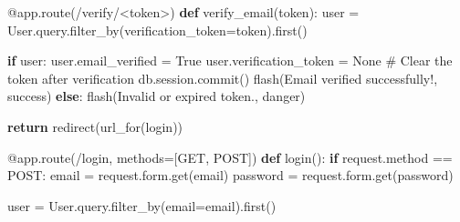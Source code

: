 \documentclass[
  letterpaper,
  DIV=11,
  numbers=noendperiod]{scrreprt}
\newenvironment{Shaded}{\begin{snugshade}}{\end{snugshade}}
\newcommand{\AttributeTok}[1]{\textcolor[rgb]{0.40,0.45,0.13}{#1}}
\newcommand{\CommentTok}[1]{\textcolor[rgb]{0.37,0.37,0.37}{#1}}
\newcommand{\ControlFlowTok}[1]{\textcolor[rgb]{0.00,0.23,0.31}{\textbf{#1}}}
\newcommand{\KeywordTok}[1]{\textcolor[rgb]{0.00,0.23,0.31}{\textbf{#1}}}
\newcommand{\NormalTok}[1]{\textcolor[rgb]{0.00,0.23,0.31}{#1}}
\newcommand{\OperatorTok}[1]{\textcolor[rgb]{0.37,0.37,0.37}{#1}}
\newcommand{\StringTok}[1]{\textcolor[rgb]{0.13,0.47,0.30}{#1}}
\newcommand{\VariableTok}[1]{\textcolor[rgb]{0.07,0.07,0.07}{#1}}
\begin{document}
\begin{Shaded}
\begin{Highlighting}[]
\AttributeTok{@app.route}\NormalTok{(}\StringTok{\textquotesingle{}/verify/\textless{}token\textgreater{}\textquotesingle{}}\NormalTok{)}
\KeywordTok{def}\NormalTok{ verify\_email(token):}
\NormalTok{    user }\OperatorTok{=}\NormalTok{ User.query.filter\_by(verification\_token}\OperatorTok{=}\NormalTok{token).first()}

    \ControlFlowTok{if}\NormalTok{ user:}
\NormalTok{        user.email\_verified }\OperatorTok{=} \VariableTok{True}
\NormalTok{        user.verification\_token }\OperatorTok{=} \VariableTok{None}  \CommentTok{\# Clear the token after verification}
\NormalTok{        db.session.commit()}
\NormalTok{        flash(}\StringTok{\textquotesingle{}Email verified successfully!\textquotesingle{}}\NormalTok{, }\StringTok{\textquotesingle{}success\textquotesingle{}}\NormalTok{)}
    \ControlFlowTok{else}\NormalTok{:}
\NormalTok{        flash(}\StringTok{\textquotesingle{}Invalid or expired token.\textquotesingle{}}\NormalTok{, }\StringTok{\textquotesingle{}danger\textquotesingle{}}\NormalTok{)}

    \ControlFlowTok{return}\NormalTok{ redirect(url\_for(}\StringTok{\textquotesingle{}login\textquotesingle{}}\NormalTok{))}

\AttributeTok{@app.route}\NormalTok{(}\StringTok{\textquotesingle{}/login\textquotesingle{}}\NormalTok{, methods}\OperatorTok{=}\NormalTok{[}\StringTok{\textquotesingle{}GET\textquotesingle{}}\NormalTok{, }\StringTok{\textquotesingle{}POST\textquotesingle{}}\NormalTok{])}
\KeywordTok{def}\NormalTok{ login():}
    \ControlFlowTok{if}\NormalTok{ request.method }\OperatorTok{==} \StringTok{\textquotesingle{}POST\textquotesingle{}}\NormalTok{:}
\NormalTok{        email }\OperatorTok{=}\NormalTok{ request.form.get(}\StringTok{\textquotesingle{}email\textquotesingle{}}\NormalTok{)}
\NormalTok{        password }\OperatorTok{=}\NormalTok{ request.form.get(}\StringTok{\textquotesingle{}password\textquotesingle{}}\NormalTok{)}

\NormalTok{        user }\OperatorTok{=}\NormalTok{ User.query.filter\_by(email}\OperatorTok{=}\NormalTok{email).first()}


\end{Highlighting}
\end{Shaded}
\end{document}

